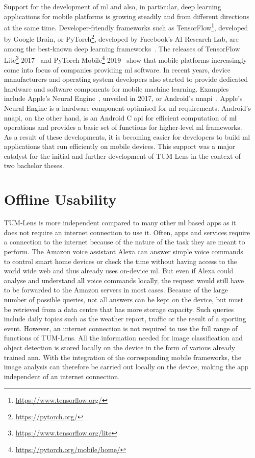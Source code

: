 \documentclass[
			   fontsize=11pt,
               paper=a4,
               bibliography=totoc,
               idxtotoc,
               headsepline,
               footsepline,
               footinclude=false,
               BCOR=12mm,
               DIV=13,
               openany,   %
               oneside    %
               ]
               {scrbook}
\begin{document}
Support for the development of \gls{ml} and also, in particular, deep learning applications for mobile platforms is growing steadily and from different directions at the same time. Developer-friendly frameworks such as TensorFlow\footnote{\url{https://www.tensorflow.org/}}, developed by Google Brain, or PyTorch\footnote{\url{https://pytorch.org/}}, developed by Facebook's AI Research Lab, are among the best-known deep learning frameworks~\cite{dl_ranking_2018}. The releases of TensorFlow Lite\footnote{\url{https://www.tensorflow.org/lite}} 2017~\cite{tflite_release_verge_2017} and PyTorch Mobile\footnote{\url{https://pytorch.org/mobile/home/}} 2019~\cite{pytorch_release_2019} show that mobile platforms increasingly come into focus of companies providing \acrlong{ml} software. In recent years, device manufacturers and operating system developers also started to provide dedicated hardware and software components for mobile machine learning. Examples include Apple's Neural Engine~\cite{neural_engine_verge_2017}, unveiled in 2017, or Android's \gls{nnapi}~\cite{nnapi_devguide_2021}. Apple's Neural Engine is a hardware component optimised for \acrlong{ml} requirements. Android's \gls{nnapi}, on the other hand, is an Android C \gls{api} for efficient computation of \gls{ml} operations and provides a basic set of functions for higher-level \gls{ml} frameworks. As a result of these developments, it is becoming easier for developers to build \gls{ml} applications that run efficiently on mobile devices. This support was a major catalyst for the initial and further development of TUM-Lens in the context of two bachelor theses.

\section{Offline Usability} \label{sec:offline_usability}

TUM-Lens is more independent compared to many other \acrlong{ml} based apps as it does not require an internet connection to use it. Often, apps and services require a connection to the internet because of the nature of the task they are meant to perform. The Amazon voice assistant Alexa can answer simple voice commands to control smart home devices or check the time without having access to the world wide web and thus already uses on-device \acrlong{ml}. But even if Alexa could analyse and understand all voice commands locally, the request would still have to be forwarded to the Amazon servers in most cases. Because of the large number of possible queries, not all answers can be kept on the device, but must be retrieved from a data centre that has more storage capacity. Such queries include daily topics such as the weather report, traffic or the result of a sporting event. However, an internet connection is not required to use the full range of functions of TUM-Lens. All the information needed for image classification and object detection is stored locally on the device in the form of various already trained \gls{ann}. With the integration of the corresponding mobile frameworks, the image analysis can therefore be carried out locally on the device, making the app independent of an internet connection.
\end{document}

